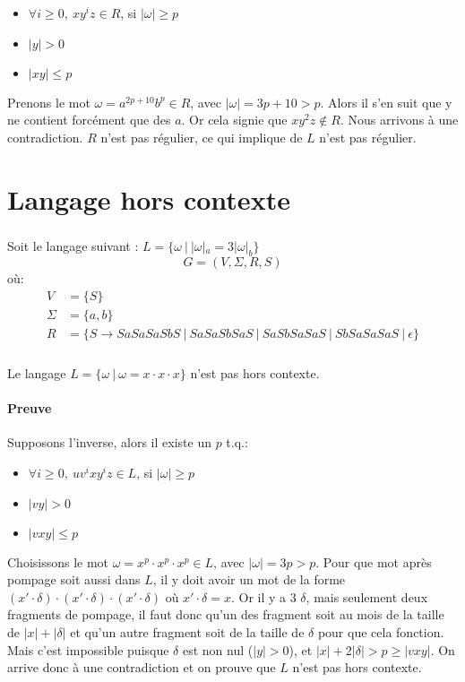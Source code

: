 \documentclass{article}
\begin{document}
\begin{itemize}
\item $\forall i \geq 0,\ xy^iz \in R$, si $|\omega| \geq p$\\
\item $|y| > 0$\\
\item $|xy| \leq p$
\end{itemize}

Prenons le mot $\omega = a^{2p + 10}b^p \in R$, avec $|\omega| = 3p + 10 > p$. Alors il s'en suit que y ne contient forcément que des $a$. Or cela signie que $xy^2z \notin R$. Nous arrivons à une contradiction. $R$ n'est pas régulier, ce qui implique de $L$ n'est pas régulier.

\section{Langage hors contexte}
\subsubsection{}
Soit le langage suivant : $L=\{\omega\ |\ |\omega|_a = 3 |\omega|_b\}$
$$G=(V,\Sigma,R,S)$$
où:
\begin{align*}
  V &= \{S\}\\
  \Sigma &= \{a, b\}\\
  R &= \{ S \rightarrow SaSaSaSbS
  \ |\ SaSaSbSaS
  \ |\ SaSbSaSaS
  \ |\ SbSaSaSaS
  \ |\  \epsilon\}
\end{align*}

\subsubsection{}
Le langage $L=\{\omega\ |\ \omega=x\cdot x\cdot x\}$ n'est pas hors contexte.
\paragraph{Preuve} Supposons l'inverse, alors il existe un $p$ t.q.:
\begin{itemize}
\item $\forall i \geq 0,\ uv^ixy^iz \in L$, si $|\omega| \geq p$\\
\item $|vy| > 0$\\
\item $|vxy| \leq p$
\end{itemize}
Choisissons le mot $\omega = x^p\cdot x^p\cdot x^p \in L$, avec $|\omega| = 3p > p$. Pour que mot après pompage soit aussi dans $L$, il y doit avoir un mot de la forme $(x' \cdot \delta) \cdot (x' \cdot \delta) \cdot (x' \cdot \delta)$ où $x' \cdot \delta = x$. Or il y a 3 $\delta$, mais seulement deux fragments de pompage, il faut donc qu'un des fragment soit au mois de la taille de $|x| + |\delta|$ et qu'un autre fragment soit de la taille de $\delta$ pour que cela fonction. Mais c'est impossible puisque $\delta$ est non nul ($|y| > 0$), et $|x| + 2|\delta| > p \geq |vxy|$. On arrive donc à une contradiction et on prouve que $L$ n'est pas hors contexte.
\end{document}
